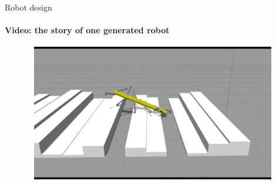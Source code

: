 \documentclass[aspectratio=169,xcolor=table]{beamer}
\begin{document}
\begin{frame}[t]{Robot design}
    \framesubtitle{Video: the story of one generated robot}
    \vspace{-0.6cm}
    \begin{figure}[H]
        \href{https://youtu.be/DcovvkTZgsg}{
            \centering\includegraphics[height=6cm,width=1\textwidth,keepaspectratio]{genetic_video_preview.jpg}}
    \end{figure}
\end{frame}
\end{document}
